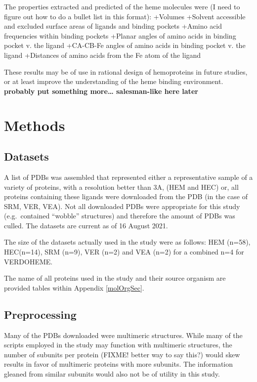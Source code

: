 \documentclass[a4paper, nobind]{templates/ociamthesis}
\begin{document}
The properties extracted and predicted of the heme molecules were (I need to figure out how to do a bullet list in this format):
+Volumes
+Solvent accessible and excluded surface areas of ligands and binding pockets
+Amino acid frequencies within binding pockets
+Planar angles of amino acids in binding pocket v. the ligand
+CA-CB-Fe angles of amino acids in binding pocket v. the ligand
+Distances of amino acids from the Fe atom of the ligand

These results may be of use in rational design of hemoproteins in future studies, or at least improve the understanding of the heme binding environment. \textbf{probably put something more\ldots{} salesman-like here later}

\adjustmtc
{}

\hypertarget{methods}{%
\chapter{Methods}\label{methods}}

\minitoc

\hypertarget{datasets}{%
\section{Datasets}\label{datasets}}

\noindent A list of PDBs was assembled that represented either a representative sample of a variety of proteins, with a resolution better than 3A, (HEM and HEC) or, all proteins containing these ligands were downloaded from the PDB (in the case of SRM, VER, VEA). Not all downloaded PDBs were appropriate for this study (e.g.~contained ``wobble'' structures) and therefore the amount of PDBs was culled. The datasets are current as of 16 August 2021.

The size of the datasets actually used in the study were as follows: HEM (n=58), HEC(n=14), SRM (n=9), VER (n=2) and VEA (n=2) for a combined n=4 for VERDOHEME.

The name of all proteins used in the study and their source organism are provided tables within Appendix \ref{molOrgSec}.

\hypertarget{preprocessing}{%
\section{Preprocessing}\label{preprocessing}}

Many of the PDBs downloaded were multimeric structures. While many of the scripts employed in the study may function with multimeric structures, the number of subunits per protein (FIXME! better way to say this?) would skew results in favor of multimeric proteins with more subunits. The information gleaned from similar subunits would also not be of utility in this study.
\end{document}
